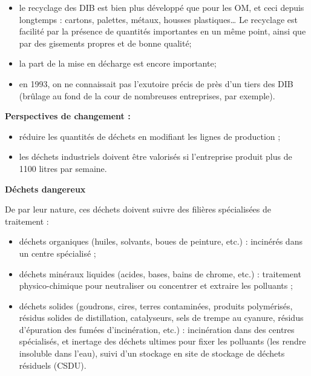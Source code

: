 \begin{itemize}

\item le recyclage des DIB est bien plus développé que pour les OM, et ceci depuis longtemps : cartons, palettes, métaux, housses plastiques… Le recyclage est facilité par la présence de quantités importantes en un même point, ainsi que par des gisements propres et de bonne qualité;

\item la part de la mise en décharge est encore importante;
\item en 1993, on ne connaissait pas l’exutoire précis de près d’un tiers des DIB (brûlage au fond de la cour de nombreuses entreprises, par exemple).
\end{itemize}
\vspace{0.5cm}


\vspace{1cm}
\textbf{Perspectives de changement :}
\vspace{0.3cm}

\begin{itemize}

\item réduire les quantités de déchets en modifiant les lignes de production ;
\item les déchets industriels doivent être valorisés si l'entreprise produit plus de 1100 litres par semaine.
\end{itemize}

\vspace{0.3cm}
\textbf{Déchets dangereux}
\vspace{0.3cm}

De par leur nature, ces déchets doivent suivre des filières spécialisées de traitement :
\begin{itemize}

\item déchets organiques (huiles, solvants, boues de peinture, etc.) : incinérés dans un centre spécialisé ;
\item déchets minéraux liquides (acides, bases, bains de chrome, etc.) : traitement physico-chimique pour neutraliser ou concentrer et extraire les polluants ;
\item déchets solides (goudrons, cires, terres contaminées, produits polymérisés, résidus solides de distillation, catalyseurs, sels de trempe au cyanure, résidus d'épuration des fumées d'incinération, etc.) : incinération dans des centres spécialisés, et inertage des déchets ultimes pour fixer les polluants (les rendre insoluble dans l'eau), suivi d'un stockage en site de stockage de déchets résiduels (CSDU).
\end{itemize}

